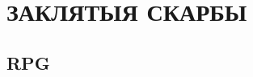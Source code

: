 \documentclass[12pt]{book}
\begin{document}
	\frontmatter
	\chapter*{\Huge \center ЗАКЛЯТЫЯ СКАРБЫ }
	\thispagestyle{empty}
    \section*{\huge \center RPG}
	\mainmatter
	

	
	\backmatter
\end{document}
